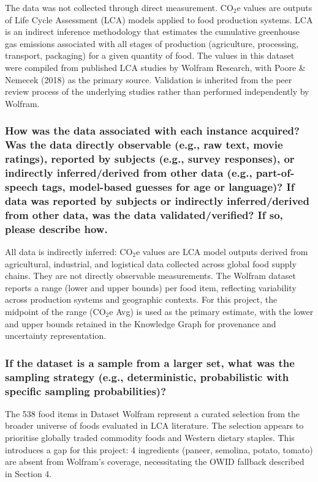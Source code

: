 \documentclass{article}
\newcommand{\question}[1]{#1}
\begin{document}
The data was not collected through direct measurement. CO$_2$e values are outputs of Life Cycle Assessment (LCA) models applied to food production systems. LCA is an indirect inference methodology that estimates the cumulative greenhouse gas emissions associated with all stages of production (agriculture, processing, transport, packaging) for a given quantity of food. The values in this dataset were compiled from published LCA studies by Wolfram Research, with Poore \& Nemecek (2018) as the primary source. Validation is inherited from the peer review process of the underlying studies rather than performed independently by Wolfram.

\question{\subsubsection*{How was the data associated with each instance acquired? Was the data directly observable (e.g., raw text, movie ratings), reported by subjects (e.g., survey responses), or indirectly inferred/derived from other data (e.g., part-of-speech tags, model-based guesses for age or language)? If data was reported by subjects or indirectly inferred/derived from other data, was the data validated/verified? If so, please describe how.}}

All data is indirectly inferred: CO$_2$e values are LCA model outputs derived from agricultural, industrial, and logistical data collected across global food supply chains. They are not directly observable measurements. The Wolfram dataset reports a range (lower and upper bounds) per food item, reflecting variability across production systems and geographic contexts. For this project, the midpoint of the range (CO$_2$e Avg) is used as the primary estimate, with the lower and upper bounds retained in the Knowledge Graph for provenance and uncertainty representation.

\question{\subsubsection*{If the dataset is a sample from a larger set, what was the sampling strategy (e.g., deterministic, probabilistic with specific sampling probabilities)?}}

The 538 food items in Dataset Wolfram represent a curated selection from the broader universe of foods evaluated in LCA literature. The selection appears to prioritise globally traded commodity foods and Western dietary staples. This introduces a gap for this project: 4 ingredients (paneer, semolina, potato, tomato) are absent from Wolfram's coverage, necessitating the OWID fallback described in Section 4.
\end{document}
